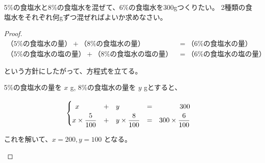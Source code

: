         \begin{example}[【例題 4】]
            5\%の食塩水と8\%の食塩水を混ぜて、6\%の食塩水を300gつくりたい。
            2種類の食塩水をそれぞれ何gずつ混ぜればよいか求めなさい。
        \end{example}

        \begin{proof}\mbox{}\\
            \begin{align*}
                （5\%の食塩水の量）+（8\%の食塩水の量） &=（6\%の食塩水の量） \\
                （5\%の食塩水の塩の量）+（8\%の食塩水の塩の量） &=（6\%の食塩水の塩の量）
            \end{align*}

            という方針にしたがって、方程式を立てる。

            \begin{hiddenanswer}
                5\%の食塩水の量を $x$ g, 8\%の食塩水の量を $y$ gとすると、
                \vspace{1em}

                \begin{align*}
                    \left\{
                    \begin{array}{@{} r @{\quad+\quad} l @{\quad=\quad} r @{}}
                        x\phantom{\times \dfrac{5}{100}} & y\phantom{\times \dfrac{8}{100}} & 300 \\
                        x \times \dfrac{5}{100} & y \times \dfrac{8}{100} & 300 \times \dfrac{6}{100}
                    \end{array}
                    \right.
                \end{align*}

                \vspace{1em}
                これを解いて、$x = 200, y = 100$ となる。

            \end{hiddenanswer}
        \end{proof}
\newpage
